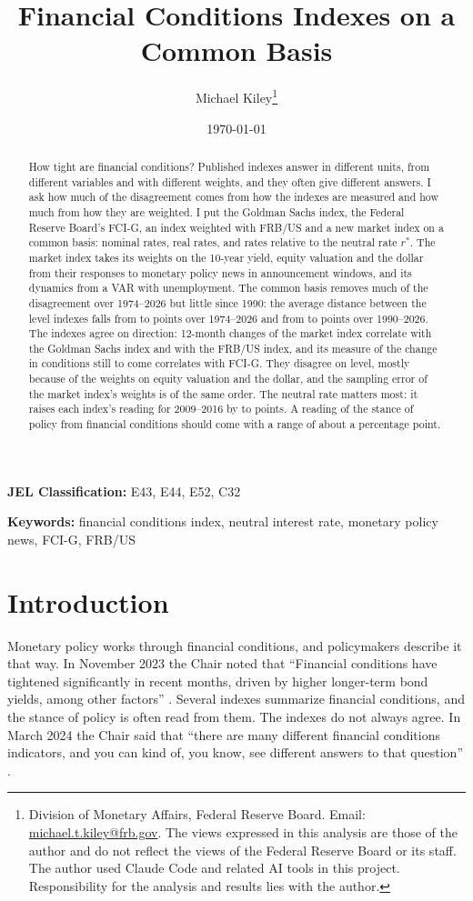 \documentclass[11pt]{article}
\title{Financial Conditions Indexes on a Common Basis}
\author{Michael Kiley\thanks{Division of Monetary Affairs, Federal Reserve Board. Email: \href{mailto:michael.t.kiley@frb.gov}{michael.t.kiley@frb.gov}. The views expressed in this analysis are those of the author and do not reflect the views of the Federal Reserve Board or its staff. The author used Claude Code and related AI tools in this project. Responsibility for the analysis and results lies with the author.}}
\date{\today}
\newcommand{\rs}{r^{*}}
\begin{document}
\maketitle

\begin{abstract}
How tight are financial conditions? Published indexes answer in different units, from different variables and with different weights, and they often give different answers. I ask how much of the disagreement comes from how the indexes are measured and how much from how they are weighted. I put the Goldman Sachs index, the Federal Reserve Board's FCI-G, an index weighted with FRB/US and a new market index on a common basis: nominal rates, real rates, and rates relative to the neutral rate $\rs$. The market index takes its weights on the 10-year yield, equity valuation and the dollar from their responses to monetary policy news in announcement windows, and its dynamics from a VAR with unemployment. The common basis removes much of the disagreement over 1974--2026 but little since 1990: the average distance between the level indexes falls from  to  points over 1974--2026 and from  to  points over 1990--2026. The indexes agree on direction: 12-month changes of the market index correlate  with the Goldman Sachs index and  with the FRB/US index, and its measure of the change in conditions still to come correlates  with FCI-G. They disagree on level, mostly because of the weights on equity valuation and the dollar, and the sampling error of the market index's weights is of the same order. The neutral rate matters most: it raises each index's reading for 2009--2016 by  to  points. A reading of the stance of policy from financial conditions should come with a range of about a percentage point.
\end{abstract}

\noindent\textbf{JEL Classification:} E43, E44, E52, C32

\noindent\textbf{Keywords:} financial conditions index, neutral interest rate, monetary policy news, FCI-G, FRB/US

\pagestyle{plain}

\newpage
{}

\section{Introduction}
\label{sec:intro}
Monetary policy works through financial conditions, and policymakers describe it that way. In November 2023 the Chair noted that ``Financial conditions have tightened significantly in recent months, driven by higher longer-term bond yields, among other factors'' \citep{powell2023}. Several indexes summarize financial conditions, and the stance of policy is often read from them. The indexes do not always agree. In March 2024 the Chair said that ``there are many different financial conditions indicators, and you can kind of, you know, see different answers to that question'' \citep{powell2024}.
\end{document}
